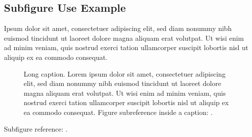 \subsection{Subfigure Use Example}
Ipsum dolor sit amet, consectetuer adipiscing elit, sed diam nonummy nibh euismod tincidunt ut laoreet dolore magna aliquam erat volutpat. Ut wisi enim ad minim veniam, quis nostrud exerci tation ullamcorper suscipit lobortis nisl ut aliquip ex ea commodo consequat.
\begin{figure}[!htb]
	\centering
	 \hfill
	 \hfill
	\caption[Short Caption]{Long caption. Lorem ipsum dolor sit amet, consectetuer adipiscing elit, sed diam nonummy nibh euismod tincidunt ut laoreet dolore magna aliquam erat volutpat. Ut wisi enim ad minim veniam, quis nostrud exerci tation ullamcorper suscipit lobortis nisl ut aliquip ex ea commodo consequat. Figure subreference inside a caption: .}
	\label{fig:sf_sample}
\end{figure}

Subfigure reference: .

